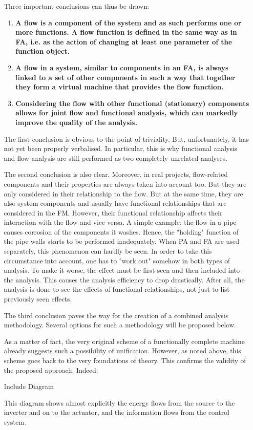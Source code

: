 \documentclass[a4paper,11pt]{article}
\begin{document}
Three important conclusions can thus be drawn:
\begin{enumerate}
\item \textbf{A flow is a component of the system and as such performs one or
  more functions. A flow function is defined in the same way as in FA, i.e. as
  the action of changing at least one parameter of the function object.}
\item \textbf{A flow in a system, similar to components in an FA, is always
  linked to a set of other components in such a way that together they form a
  virtual machine that provides the flow function.}
\item \textbf{Considering the flow with other functional (stationary)
  components allows for joint flow and functional analysis, which can markedly
  improve the quality of the analysis.}
\end{enumerate}
The first conclusion is obvious to the point of triviality. But,
unfortunately, it has not yet been properly verbalised. In particular, this is
why functional analysis and flow analysis are still performed as two
completely unrelated analyses.

The second conclusion is also clear. Moreover, in real projects, flow-related
components and their properties are always taken into account too. But they
are only considered in their relationship to the flow. But at the same time,
they are also system components and usually have functional relationships that
are considered in the FM. However, their functional relationship affects their
interaction with the flow and vice versa. A simple example: the flow in a pipe
causes corrosion of the components it washes. Hence, the "holding" function of
the pipe walls starts to be performed inadequately. When PA and FA are used
separately, this phenomenon can hardly be seen. In order to take this
circumstance into account, one has to "work out" somehow in both types of
analysis. To make it worse, the effect must be first seen and then included
into the analysis. This causes the analysis efficiency to drop drastically.
After all, the analysis is done to see the effects of functional
relationships, not just to list previously seen effects.

The third conclusion paves the way for the creation of a combined analysis
methodology. Several options for such a methodology will be proposed below.

As a matter of fact, the very original scheme of a functionally complete
machine already suggests such a possibility of unification. However, as noted
above, this scheme goes back to the very foundations of theory. This confirms
the validity of the proposed approach. Indeed:
\begin{center}
  Include Diagram
\end{center}
This diagram shows almost explicitly the energy flows from the source to the
inverter and on to the actuator, and the information flows from the control
system.
\end{document}

